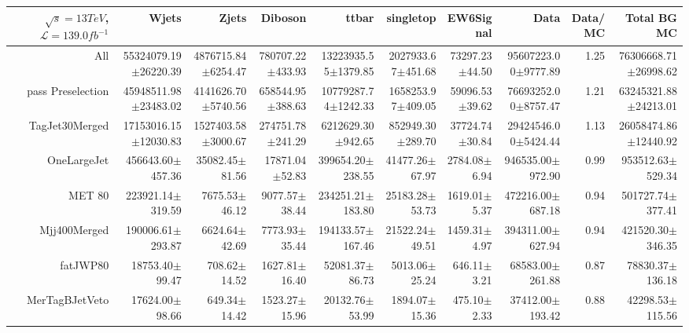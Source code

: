  \begin{tabular}{ r ||  r  r  r  r  r  r || r r r |} 
 \ensuremath{\sqrt{s}=13 TeV}, \ensuremath{\mathcal{L}=139.0 fb^{-1}}  & Wjets & Zjets & Diboson & ttbar & singletop & EW6Signal& Data & Data/MC & Total BG MC \tabularnewline 
 \hline 
All & 55324079.19$\pm$26220.39 & 4876715.84$\pm$6254.47 & 780707.22$\pm$433.93 & 13223935.55$\pm$1379.85 & 2027933.67$\pm$451.68 & 73297.23$\pm$44.50 & 95607223.00$\pm$9777.89 & 1.25 & 76306668.71$\pm$26998.62\tabularnewline \hline 
pass Preselection & 45948511.98$\pm$23483.02 & 4141626.70$\pm$5740.56 & 658544.95$\pm$388.63 & 10779287.74$\pm$1242.33 & 1658253.97$\pm$409.05 & 59096.53$\pm$39.62 & 76693252.00$\pm$8757.47 & 1.21 & 63245321.88$\pm$24213.01\tabularnewline \hline 
TagJet30Merged & 17153016.15$\pm$12030.83 & 1527403.58$\pm$3000.67 & 274751.78$\pm$241.29 & 6212629.30$\pm$942.65 & 852949.30$\pm$289.70 & 37724.74$\pm$30.84 & 29424546.00$\pm$5424.44 & 1.13 & 26058474.86$\pm$12440.92\tabularnewline \hline 
OneLargeJet & 456643.60$\pm$457.36 & 35082.45$\pm$81.56 & 17871.04$\pm$52.83 & 399654.20$\pm$238.55 & 41477.26$\pm$67.97 & 2784.08$\pm$6.94 & 946535.00$\pm$972.90 & 0.99 & 953512.63$\pm$529.34\tabularnewline \hline 
MET 80 & 223921.14$\pm$319.59 & 7675.53$\pm$46.12 & 9077.57$\pm$38.44 & 234251.21$\pm$183.80 & 25183.28$\pm$53.73 & 1619.01$\pm$5.37 & 472216.00$\pm$687.18 & 0.94 & 501727.74$\pm$377.41\tabularnewline \hline 
Mjj400Merged & 190006.61$\pm$293.87 & 6624.64$\pm$42.69 & 7773.93$\pm$35.44 & 194133.57$\pm$167.46 & 21522.24$\pm$49.51 & 1459.31$\pm$4.97 & 394311.00$\pm$627.94 & 0.94 & 421520.30$\pm$346.35\tabularnewline \hline 
fatJWP80 & 18753.40$\pm$99.47 & 708.62$\pm$14.52 & 1627.81$\pm$16.40 & 52081.37$\pm$86.73 & 5013.06$\pm$25.24 & 646.11$\pm$3.21 & 68583.00$\pm$261.88 & 0.87 & 78830.37$\pm$136.18\tabularnewline \hline 
MerTagBJetVeto & 17624.00$\pm$98.66 & 649.34$\pm$14.42 & 1523.27$\pm$15.96 & 20132.76$\pm$53.99 & 1894.07$\pm$15.36 & 475.10$\pm$2.33 & 37412.00$\pm$193.42 & 0.88 & 42298.53$\pm$115.56\tabularnewline \hline 
\end{tabular}
